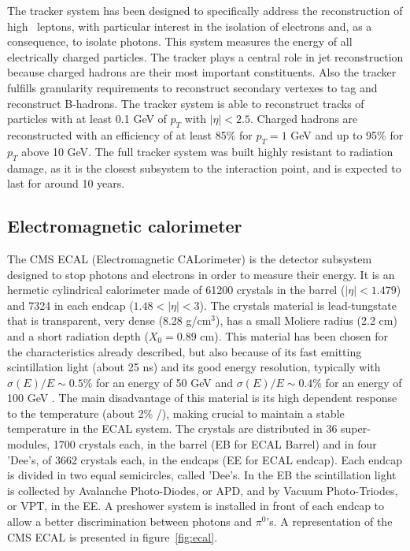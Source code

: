 The tracker system has been designed to specifically address the reconstruction of high \pt~leptons, with particular interest in the isolation of electrons and, as a consequence, to isolate photons. This system measures the energy of all electrically charged particles. The tracker plays a central role in jet reconstruction because charged hadrons are their most important constituents. Also the tracker fulfills granularity requirements to reconstruct secondary vertexes to tag and reconstruct B-hadrons. The tracker system is able to reconstruct tracks of particles with at least 0.1 GeV of $p_{T}$ with $|\eta|<2.5$. Charged hadrons are reconstructed with an efficiency of at least 85\% for $p_{T}=1$ GeV and up to 95\% for $p_{T}$ above 10 GeV. The full tracker system was built highly resistant to radiation damage, as it is the closest subsystem to the interaction point, and is expected to last for around 10 years. %

\subsection{Electromagnetic calorimeter}
\label{sec:ecal}

The CMS ECAL (Electromagnetic CALorimeter) is the detector subsystem designed to stop photons and electrons in order to measure their energy. It is an hermetic cylindrical calorimeter made of 61200 crystals in the barrel ($|\eta|<1.479$) and 7324 in each endcap ($1.48<|\eta|<3$). The crystals material is lead-tungstate that is transparent, very dense (8.28 g/$\text{cm}^{3}$), has a small Moliere radius (2.2 cm) and a short radiation depth ($X_{0}=0.89$ cm). This material has been chosen for the characteristics already described, but also because of its fast emitting scintillation light (about 25 ns) and its good energy resolution, typically with $\sigma(E)/E\sim 0.5$\% for an energy of 50 GeV and $\sigma(E)/E\sim 0.4$\% for an energy of 100 GeV . The main disadvantage of this material is its high dependent response to the temperature (about 2\% /\celsius), making crucial to maintain a stable temperature in the ECAL system. The crystals are distributed in 36 super-modules, 1700 crystals each, in the barrel (EB for ECAL Barrel) and in four 'Dee's, of 3662 crystals each, in the endcaps (EE for ECAL endcap). Each endcap is divided in two equal semicircles, called 'Dee's. In the EB the scintillation light is collected by Avalanche Photo-Diodes, or APD, and by Vacuum Photo-Triodes, or VPT, in the EE. A preshower system is installed in front of each endcap to allow a better discrimination between photons and $\pi^{0}$'s. A representation of the CMS ECAL is presented in figure~\ref{fig:ecal}.

